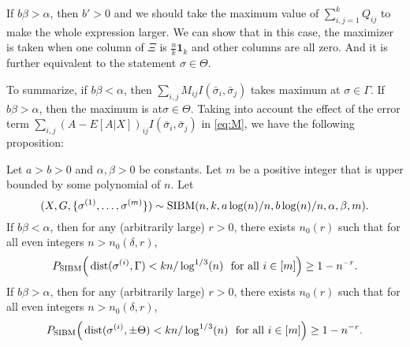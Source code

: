 \documentclass{article}
\begin{document}
If $b\beta>\alpha$, then $b' > 0$ and we should take the maximum value of $\sum_{i,j=1}^k Q_{ij}$ to make the whole expression larger. We can show that in this case, the maximizer is taken when one column of $\Xi$ is $\frac{n}{k}  \mathbf{1}_k$ and other columns are all zero. And it is further equivalent to the statement $\sigma \in \Theta$.

To summarize, if $b\beta<\alpha$, then $\sum_{i,j} M_{ij} I(\bar{\sigma}_i, \bar{\sigma}_j)$ takes maximum at $\sigma \in \Gamma$.
If $b\beta>\alpha$, then the maximum is at$\sigma \in \Theta$.
Taking into account the effect of the error term $ \sum_{i,j}  (A-E[A|X])_{ij}
 I(\bar{\sigma}_i, \bar{\sigma}_j)  $ in \eqref{eq:M}, we have the following proposition:

\begin{proposition} \label{prop:1}
Let $a>b>0$ and $\alpha,\beta>0$ be constants. Let $m$ be a positive integer that is upper bounded by some polynomial of $n$.
Let 
$$
(X,G,\{\sigma^{(1)},\dots,\sigma^{(m)}\})\sim \operatorname{SIBM}(n,k, a\log(n)/n, b\log(n)/n, \alpha,\beta, m) .
$$
If $b\beta <\alpha$, then for any (arbitrarily large) $r>0$, there exists $n_0(r)$ such that for all even integers $n>n_0(\delta, r)$,
$$
P_{\operatorname{SIBM}} \Big(\operatorname{dist}(\sigma^{(i)}, \Gamma)< kn/\log^{1/3}(n)
\text{~~for all~} i\in[m] \Big) \ge 1- n^{-r} .
$$
If $b\beta >\alpha$, then for any (arbitrarily large) $r>0$, there exists $n_0(r)$ such that for all even integers $n>n_0(\delta, r)$,
$$
P_{\operatorname{SIBM}} \Big(\operatorname{dist}(\sigma^{(i)},\pm \Theta)< kn/\log^{1/3}(n)
\text{~~for all~} i\in[m] \Big) \ge 1- n^{-r} .
$$
\end{proposition}
\end{document}
